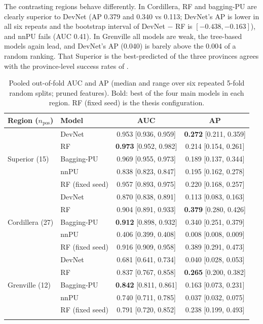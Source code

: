 \documentclass[pdflatex,sn-apa]{sn-jnl}
\begin{document}
The contrasting regions behave differently. In Cordillera, RF and bagging-PU are clearly superior to DevNet (AP 0.379 and 0.340 vs 0.113; DevNet's AP is lower in all six repeats and the bootstrap interval of DevNet $-$ RF is $[-0.438, -0.163]$), and nnPU fails (AUC 0.41). In Grenville all models are weak, the tree-based models again lead, and DevNet's AP (0.040) is barely above the 0.004 of a random ranking. That Superior is the best-predicted of the three provinces agrees with the province-level success rates of \citet{Parsa2024}.

\begin{table}[t]
\caption{Pooled out-of-fold AUC and AP (median and range over six repeated 5-fold random splits; pruned features). Bold: best of the four main models in each region. RF (fixed seed) is the thesis configuration.}\label{tab:benchmark}
\footnotesize
\begin{tabular*}{\textwidth}{@{\extracolsep\fill}llcc}
\toprule
Region ($n_{\mathrm{pos}}$) & Model & AUC & AP \\
\midrule
\multirow{5}{*}{Superior (15)} & DevNet & 0.953 [0.936, 0.959] & \textbf{0.272} [0.211, 0.359] \\
 & RF & \textbf{0.973} [0.952, 0.982] & 0.214 [0.154, 0.261] \\
 & Bagging-PU & 0.969 [0.955, 0.973] & 0.189 [0.137, 0.344] \\
 & nnPU & 0.838 [0.823, 0.847] & 0.195 [0.162, 0.278] \\
 & RF (fixed seed) & 0.957 [0.893, 0.975] & 0.220 [0.168, 0.257] \\
\midrule
\multirow{5}{*}{Cordillera (27)} & DevNet & 0.870 [0.838, 0.891] & 0.113 [0.083, 0.163] \\
 & RF & 0.904 [0.891, 0.933] & \textbf{0.379} [0.280, 0.426] \\
 & Bagging-PU & \textbf{0.912} [0.898, 0.932] & 0.340 [0.251, 0.379] \\
 & nnPU & 0.406 [0.399, 0.408] & 0.008 [0.008, 0.009] \\
 & RF (fixed seed) & 0.916 [0.909, 0.958] & 0.389 [0.291, 0.473] \\
\midrule
\multirow{5}{*}{Grenville (12)} & DevNet & 0.681 [0.641, 0.734] & 0.040 [0.028, 0.053] \\
 & RF & 0.837 [0.767, 0.858] & \textbf{0.265} [0.200, 0.382] \\
 & Bagging-PU & \textbf{0.842} [0.811, 0.861] & 0.163 [0.073, 0.231] \\
 & nnPU & 0.740 [0.711, 0.785] & 0.037 [0.032, 0.075] \\
 & RF (fixed seed) & 0.791 [0.720, 0.852] & 0.238 [0.199, 0.493] \\
\botrule
\end{tabular*}
\end{table}
\end{document}
